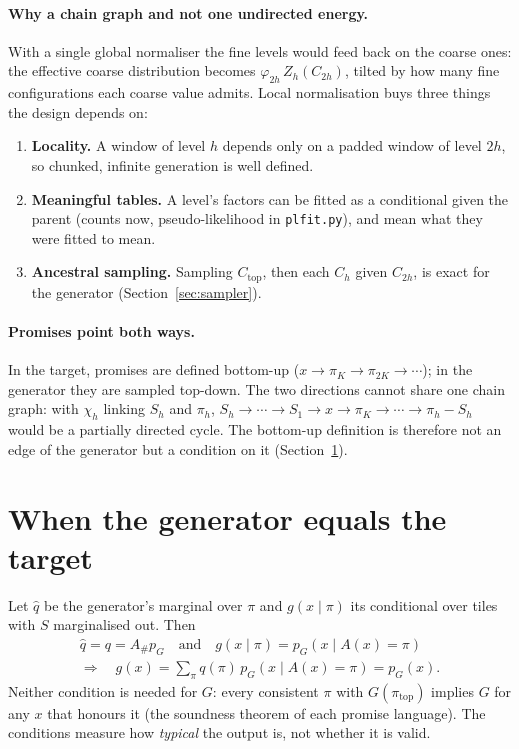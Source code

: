 \documentclass[11pt]{article}
\newcommand{\1}{\mathds{1}}
\begin{document}
\paragraph{Why a chain graph and not one undirected energy.} With a single global
normaliser the fine levels would feed back on the coarse ones: the effective coarse
distribution becomes $\varphi_{2h}\,Z_h(C_{2h})$, tilted by how many fine configurations
each coarse value admits. Local normalisation buys three things the design depends on:
\begin{enumerate}
  \item \textbf{Locality.} A window of level $h$ depends only on a padded window of level
        $2h$, so chunked, infinite generation is well defined.
  \item \textbf{Meaningful tables.} A level's factors can be fitted as a conditional given
        the parent (counts now, pseudo-likelihood in \texttt{plfit.py}), and mean what they
        were fitted to mean.
  \item \textbf{Ancestral sampling.} Sampling $C_{\text{top}}$, then each $C_h$ given
        $C_{2h}$, is exact for the generator (Section~\ref{sec:sampler}).
\end{enumerate}

\paragraph{Promises point both ways.} In the target, promises are defined bottom-up
($x \to \pi_K \to \pi_{2K} \to \cdots$); in the generator they are sampled top-down. The two
directions cannot share one chain graph: with $\chi_h$ linking $S_h$ and $\pi_h$,
$S_h \to \cdots \to S_1 \to x \to \pi_K \to \cdots \to \pi_h - S_h$ would be a partially
directed cycle. The bottom-up definition is therefore not an edge of the generator but a
condition on it (Section~\ref{sec:agree}).

\section{When the generator equals the target}
\label{sec:agree}

Let $\hat q$ be the generator's marginal over $\pi$ and $g(x \mid \pi)$ its conditional over
tiles with $S$ marginalised out. Then
\begin{gather*}
  \hat q = q = A_\# p_G
  \quad\text{and}\quad
  g(x \mid \pi) = p_G(x \mid A(x) = \pi) \\
  \Longrightarrow\quad
  g(x) = \textstyle\sum_\pi q(\pi)\, p_G(x \mid A(x)=\pi) = p_G(x).
\end{gather*}
Neither condition is needed for $G$: every consistent $\pi$ with $G(\pi_{\text{top}})$
implies $G$ for any $x$ that honours it (the soundness theorem of each promise language).
The conditions measure how \emph{typical} the output is, not whether it is valid.
\end{document}
